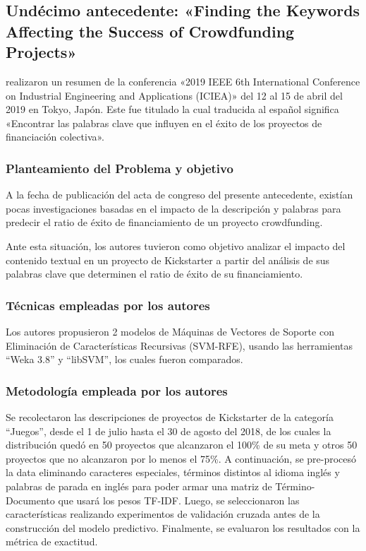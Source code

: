 \subsection{Undécimo antecedente: «Finding the Keywords Affecting the Success of Crowdfunding Projects» \citep*{pr_chen2019keywords_crowdfunding}}
\citeauthor{pr_chen2019keywords_crowdfunding} realizaron un resumen de la conferencia «2019 IEEE 6th International Conference on Industrial Engineering and Applications (ICIEA)» del 12 al 15 de abril del 2019 en Tokyo, Japón. Este fue titulado  la cual traducida al español significa «Encontrar las palabras clave que influyen en el éxito de los proyectos de financiación colectiva».

\subsubsection{Planteamiento del Problema y objetivo}
A la fecha de publicación del acta de congreso del presente antecedente, existían pocas investigaciones basadas en el impacto de la descripción y palabras para predecir el ratio de éxito de financiamiento de un proyecto crowdfunding.

Ante esta situación, los autores tuvieron como objetivo analizar el impacto del contenido textual en un proyecto de Kickstarter a partir del análisis de sus palabras clave que determinen el ratio de éxito de su financiamiento.

\subsubsection{Técnicas empleadas por los autores}
Los autores propusieron 2 modelos de Máquinas de Vectores de Soporte con Eliminación de Características Recursivas (SVM-RFE), usando las herramientas “Weka 3.8” y “libSVM”, los cuales fueron comparados.

\subsubsection{Metodología empleada por los autores}
Se recolectaron las descripciones de proyectos de Kickstarter de la categoría “Juegos”, desde el 1 de julio hasta el 30 de agosto del 2018, de los cuales la distribución quedó en 50 proyectos que alcanzaron el 100\% de su meta y otros 50 proyectos que no alcanzaron por lo menos el 75\%. A continuación, se pre-procesó la data eliminando caracteres especiales, términos distintos al idioma inglés y palabras de parada en inglés para poder armar una matriz de Término-Documento que usará los pesos TF-IDF. Luego, se seleccionaron las características realizando experimentos de validación cruzada antes de la construcción del modelo predictivo. Finalmente, se evaluaron los resultados con la métrica de exactitud.

